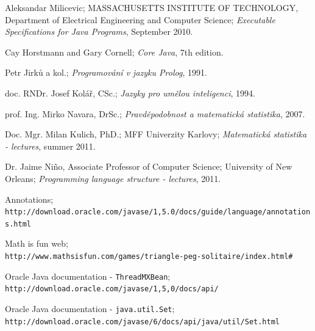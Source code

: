 \documentclass[11pt,twoside,a4paper]{book}
\begin{document}
\begin{thebibliography}{1}

Aleksandar Milicevic; MASSACHUSETTS INSTITUTE OF TECHNOLOGY, Department of
Electrical Engineering and Computer Science; \textit{Executable Specifications
for Java Programs}, September 2010.

Cay Horstmann and Gary Cornell; \textit{Core Java}, 7th edition.

Petr Jirků a kol.; \textit{Programování v jazyku Prolog}, 1991.

doc. RNDr. Josef Kolář, CSc.; \textit{Jazyky pro umělou inteligenci}, 1994.


prof. Ing. Mirko Navara, DrSc.; \textit{Pravděpodobnost a matematická
statistika}, 2007.

Doc. Mgr. Milan Kulich, PhD.; MFF
Univerzity Karlovy; \textit{Matematická statistika - lectures}, summer 2011.


Dr. Jaime Niño, Associate Professor of Computer Science; University of New
Orleans; \textit{Programming language structure - lectures}, 2011.

Annotations;\\
\verb|http://download.oracle.com/javase/1,5.0/docs/guide/language/annotations.html|

Math
is fun
web;\\\verb|http://www.mathsisfun.com/games/triangle-peg-solitaire/index.html#|

Oracle Java documentation - \verb|ThreadMXBean|;\\
\verb|http://download.oracle.com/javase/1,5,0/docs/api/|

Oracle Java documentation - \verb|java.util.Set|;\\
\verb|http://download.oracle.com/javase/6/docs/api/java/util/Set.html|

\end{thebibliography}

%

\end{document}
